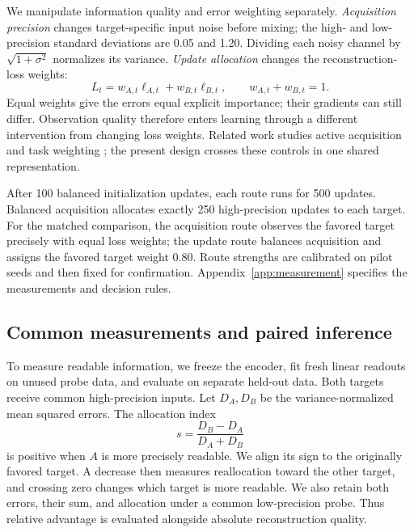 We manipulate information quality and error weighting separately. \emph{Acquisition precision} changes target-specific input noise before mixing; the high- and low-precision standard deviations are 0.05 and 1.20. Dividing each noisy channel by $\sqrt{1+\sigma^2}$ normalizes its variance. \emph{Update allocation} changes the reconstruction-loss weights:
\begin{equation}
L_t=w_{A,t}\ell_{A,t}+w_{B,t}\ell_{B,t},\qquad w_{A,t}+w_{B,t}=1.
\label{eq:loss}
\end{equation}
Equal weights give the errors equal explicit importance; their gradients can still differ. Observation quality therefore enters learning through a different intervention from changing loss weights. Related work studies active acquisition and task weighting \citep{shim2018joint,chen2022active,chen2018gradnorm,yu2020gradient}; the present design crosses these controls in one shared representation.

After 100 balanced initialization updates, each route runs for 500 updates. Balanced acquisition allocates exactly 250 high-precision updates to each target. For the matched comparison, the acquisition route observes the favored target precisely with equal loss weights; the update route balances acquisition and assigns the favored target weight 0.80. Route strengths are calibrated on pilot seeds and then fixed for confirmation. Appendix~\ref{app:measurement} specifies the measurements and decision rules.

\subsection{Common measurements and paired inference}
To measure readable information, we freeze the encoder, fit fresh linear readouts on unused probe data, and evaluate on separate held-out data. Both targets receive common high-precision inputs. Let $D_A,D_B$ be the variance-normalized mean squared errors. The allocation index
\begin{equation}
s=\frac{D_B-D_A}{D_A+D_B}
\label{eq:s}
\end{equation}
is positive when $A$ is more precisely readable. We align its sign to the originally favored target. A decrease then measures reallocation toward the other target, and crossing zero changes which target is more readable. We also retain both errors, their sum, and allocation under a common low-precision probe. Thus relative advantage is evaluated alongside absolute reconstruction quality.

